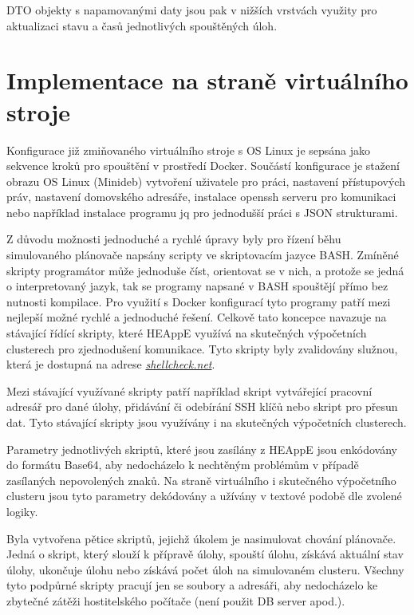 DTO objekty s napamovanými daty jsou pak v nižších vrstvách využity pro aktualizaci stavu a časů jednotlivých spouštěných úloh.

\section{Implementace na straně virtuálního stroje}
Konfigurace již zmiňovaného virtuálního stroje s OS Linux je sepsána jako sekvence kroků pro spouštění v prostředí Docker. Součástí konfigurace je stažení obrazu OS Linux (Minideb) vytvoření uživatele pro práci, nastavení přístupových práv, nastavení domovského adresáře, instalace openssh serveru pro komunikaci nebo například instalace programu jq pro jednodušší práci s JSON strukturami.

Z důvodu možnosti jednoduché a rychlé úpravy byly pro řízení běhu simulovaného plánovače napsány scripty ve skriptovacím jazyce BASH. Zmíněné skripty programátor může jednoduše číst, orientovat se v nich, a protože se jedná o interpretovaný jazyk, tak se programy napsané v BASH spouštějí přímo bez nutnosti kompilace. Pro využití s Docker konfigurací tyto programy patří mezi nejlepší možné rychlé a jednoduché řešení. Celkově tato koncepce navazuje na stávající řídící skripty, které HEAppE využívá na skutečných výpočetních clusterech pro zjednodušení komunikace. Tyto skripty byly zvalidovány služnou, která je dostupná na adrese \emph{\href{https://www.shellcheck.net/}{shellcheck.net}}.

Mezi stávající využívané skripty patří například skript vytvářející pracovní adresář pro dané úlohy, přidávání či odebírání SSH klíčů nebo skript pro přesun dat. Tyto stávající skripty jsou využívány i na skutečných výpočetních clusterech.

Parametry jednotlivých skriptů, které jsou zasílány z HEAppE jsou enkódovány do formátu Base64, aby nedocházelo k nechtěným problémům v případě zasílaných nepovolených znaků. Na straně virtuálního i skutečného výpočetního clusteru jsou tyto parametry dekódovány a užívány v textové podobě dle zvolené logiky.



\hfill \break


Byla vytvořena pětice skriptů, jejichž úkolem je nasimulovat chování plánovače. Jedná o skript, který slouží k přípravě úlohy, spouští úlohu, získává aktuální stav úlohy, ukončuje úlohu nebo získává počet úloh na simulovaném clusteru. Všechny tyto podpůrné skripty pracují jen se soubory a adresáři, aby nedocházelo ke zbytečné zátěži hostitelského počítače (není použit DB server apod.). 

